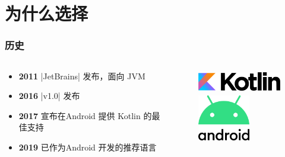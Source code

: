 \section{为什么选择 }%
\begin{frame}[fragile]
    \frametitle{历史}
    \begin{columns}
        \begin{column}{0.5\textwidth}
            \begin{itemize}
                \item \textbf{2011} |JetBrains| 发布，面向 JVM
                \item \textbf{2016} |v1.0| 发布
                \item \textbf{2017} \google{} 宣布在{\color{android}\faAndroid}Android 提供 Kotlin 的最佳支持
                \item \textbf{2019} 已作为{\color{android}\faAndroid}Android 开发的推荐语言
            \end{itemize}
        \end{column}
        \begin{column}{0.5\textwidth}
            \begin{figure}
            \begin{center}
                \includegraphics[height=1cm]{fig/Kotlin}\\
                \vspace{12pt}
                \includegraphics[height=2cm]{fig/android}
            \end{center}
            \end{figure}
        \end{column}
    \end{columns}
\end{frame}

